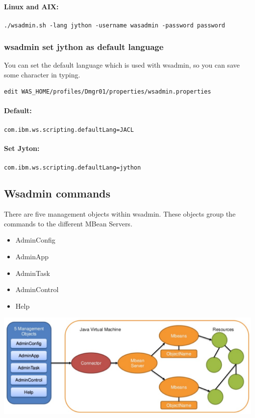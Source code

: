 \documentclass[12pt,a4paper]{article}
\begin{document}
\paragraph{Linux and AIX\textsuperscript{\textregistered}:}

\lstinline[style=BashInputStyle]{./wsadmin.sh -lang jython -username wasadmin -password password}

\subsubsection{wsadmin set jython as default language}

You can set the default language which is used with wsadmin, so you can save some character in typing.

\begin{lstlisting}[style=BashInputStyle]
edit WAS_HOME/profiles/Dmgr01/properties/wsadmin.properties
\end{lstlisting}

\paragraph{Default:}

\texttt{com.ibm.ws.scripting.defaultLang=JACL}

\paragraph{Set Jyton:}

\texttt{com.ibm.ws.scripting.defaultLang=jython}

\subsection{Wsadmin commands}

There are five management objects within wsadmin. These objects group the commands to the different MBean Servers.

\begin{itemize}
\item AdminConfig
\item AdminApp
\item AdminTask
\item AdminControl
\item Help
\end{itemize}

\includegraphics[keepaspectratio=true,width=\textwidth]{wsadmin-objects.png}
\end{document}
